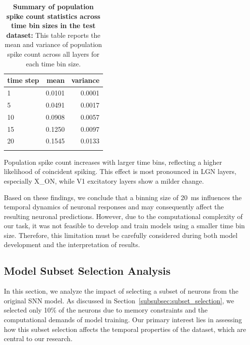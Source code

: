 \begin{table}
    \centering\footnotesize\sf
    \begin{tabular}{lrr}
    \toprule
    time step & mean & variance \\
    \midrule
    1 & 0.0101 & 0.0001 \\
    5 & 0.0491 & 0.0017 \\
    10 & 0.0908 & 0.0057 \\
    15 & 0.1250 & 0.0097 \\
    20 & 0.1545 & 0.0133 \\
    \addlinespace %
    \bottomrule
    \end{tabular}
    \caption{\textbf{Summary of population spike count statistics across time bin sizes in the test dataset:} This table reports the mean and variance of population spike count across all layers for each time bin size.}
    \label{tab:synchrony_time_bins_summary_test}
\end{table}

Population spike count increases with larger time bins, reflecting a higher likelihood of coincident spiking. This effect is most pronounced in LGN layers, especially X\_ON, while V1 excitatory layers show a milder change.

Based on these findings, we conclude that a binning size of 20~ms influences the temporal dynamics of neuronal responses and may consequently affect the resulting neuronal predictions. However, due to the computational complexity of our task, it was not feasible to develop and train models using a smaller time bin size. Therefore, this limitation must be carefully considered during both model development and the interpretation of results.

\subsection{Model Subset Selection Analysis}
\label{subsec:subset_selection_analysis}

In this section, we analyze the impact of selecting a subset of neurons from the original SNN model. As discussed in Section~\ref{subsubsec:subset_selection}, we selected only 10\% of the neurons due to memory constraints and the computational demands of model training. Our primary interest lies in assessing how this subset selection affects the temporal properties of the dataset, which are central to our research.

